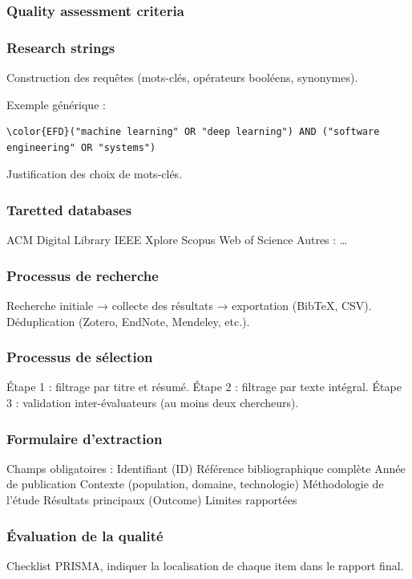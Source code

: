 \documentclass[a4paper,12pt]{article}
\begin{document}
\subsubsection{Quality assessment criteria}
\label{sec:orgb11b5f8}

\subsubsection{Research strings}
\label{sec:orge0b94cd}
Construction des requêtes (mots-clés, opérateurs booléens, synonymes).

Exemple générique :
\begin{Code}
\begin{Verbatim}
\color{EFD}("machine learning" OR "deep learning") AND ("software engineering" OR "systems")
\end{Verbatim}
\end{Code}

Justification des choix de mots-clés.
\subsubsection{Taretted databases}
\label{sec:org2db8ff6}
ACM Digital Library
IEEE Xplore
Scopus
Web of Science
Autres : …
\subsubsection{Processus de recherche}
\label{sec:orgfce9148}
Recherche initiale → collecte des résultats → exportation (BibTeX, CSV).
Déduplication (Zotero, EndNote, Mendeley, etc.).
\subsubsection{Processus de sélection}
\label{sec:orge3849ba}
Étape 1 : filtrage par titre et résumé.
Étape 2 : filtrage par texte intégral.
Étape 3 : validation inter-évaluateurs (au moins deux chercheurs).
\subsubsection{Formulaire d’extraction}
\label{sec:org0b72372}
Champs obligatoires :
    Identifiant (ID)
    Référence bibliographique complète
    Année de publication
    Contexte (population, domaine, technologie)
    Méthodologie de l’étude
    Résultats principaux (Outcome)
    Limites rapportées
\subsubsection{Évaluation de la qualité}
\label{sec:org985fe5b}
Checklist PRISMA, indiquer la localisation de chaque item dans le rapport final.
\end{document}
